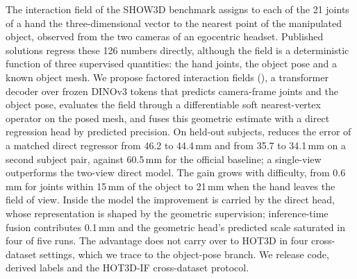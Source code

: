 The interaction field of the SHOW3D benchmark assigns to each of the 21 joints of a hand the three-dimensional vector to the nearest point of the manipulated object, observed from the two cameras of an egocentric headset. Published solutions regress these 126 numbers directly, although the field is a deterministic function of three supervised quantities: the hand joints, the object pose and a known object mesh. We propose factored interaction fields (\method{}), a transformer decoder over frozen DINOv3 tokens that predicts camera-frame joints and the object pose, evaluates the field through a differentiable soft nearest-vertex operator on the posed mesh, and fuses this geometric estimate with a direct regression head by predicted precision. On held-out subjects, \method{} reduces the error of a matched direct regressor from 46.2 to 44.4\,mm and from 35.7 to 34.1\,mm on a second subject pair, against 60.5\,mm for the official baseline; a single-view \method{} outperforms the two-view direct model. The gain grows with difficulty, from 0.6\,mm for joints within 15\,mm of the object to 21\,mm when the hand leaves the field of view. Inside the model the improvement is carried by the direct head, whose representation is shaped by the geometric supervision; inference-time fusion contributes 0.1\,mm and the geometric head's predicted scale saturated in four of five runs. The advantage does not carry over to HOT3D in four cross-dataset settings, which we trace to the object-pose branch. We release code, derived labels and the HOT3D-IF cross-dataset protocol.
